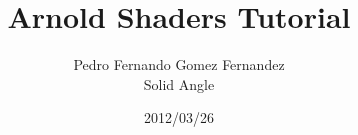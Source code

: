 \documentclass[12pt,a4paper,titlepage]{article}
\begin{document}
\renewcommand{\listingscaption}{Example}
\renewcommand{\theFancyVerbLine}{\sffamily\textcolor[rgb]{0.5,0.5,0.5}{\scriptsize\arabic{FancyVerbLine}}}

\title{\bfseries\huge Arnold Shaders Tutorial}
\author{Pedro Fernando Gomez Fernandez\\ Solid Angle}
\date{2012/03/26}
\maketitle

\tableofcontents
\newpage

\setcounter{page}{1}






\end{document}
